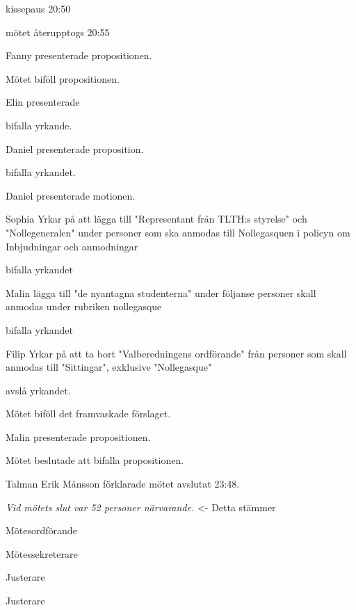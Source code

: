 \documentclass[10pt]{article}
\def\mo{Erik Månsson}
\def\ms{Axel Voss}
\def\ji{xxx}
\def\jii{xxx}
\begin{document}
\begin{paragrafer}
\begin{paragrafer}
		kissepaus 20:50 

		mötet återupptogs 20:55

		
		Fanny presenterade propositionen.

		Mötet biföll propositionen.

			Elin presenterade

			\Mba bifalla yrkande.

		Daniel presenterade proposition. 

		\Mba bifalla yrkandet.

		
		Daniel presenterade motionen.

		
		Sophia Yrkar på att lägga till "Representant från TLTH:s styrelse" och "Nollegeneralen" under personer som ska anmodas till Nollegasquen i policyn om Inbjudningar och anmodningar
		
		\Mba bifalla yrkandet

		Malin \ypa lägga till "de nyantagna studenterna" under följanse personer skall anmodas under rubriken nollegasque

		\Mba bifalla yrkandet

		Filip Yrkar på att ta bort "Valberedningens ordförande" från personer som skall anmodas till "Sittingar", exklusive "Nollegasque"

		\Mba avslå yrkandet.

		Mötet biföll det framvaskade förslaget. 


		Malin presenterade propositionen.

		Mötet beslutade att bifalla propositionen.

    \end{paragrafer}


Talman {\mo} förklarade mötet avslutat 23:48.

\emph{Vid mötets slut var 52 personer närvarande.} <- Detta stämmer
 
\end{paragrafer}

\hidesignfoot
\begin{signatures}{4}
\signature{\mo}{Mötesordförande}
\signature{\ms}{Mötessekreterare}
\signature{\ji}{Justerare}
\signature{\jii}{Justerare}
\end{signatures}
\end{document}
